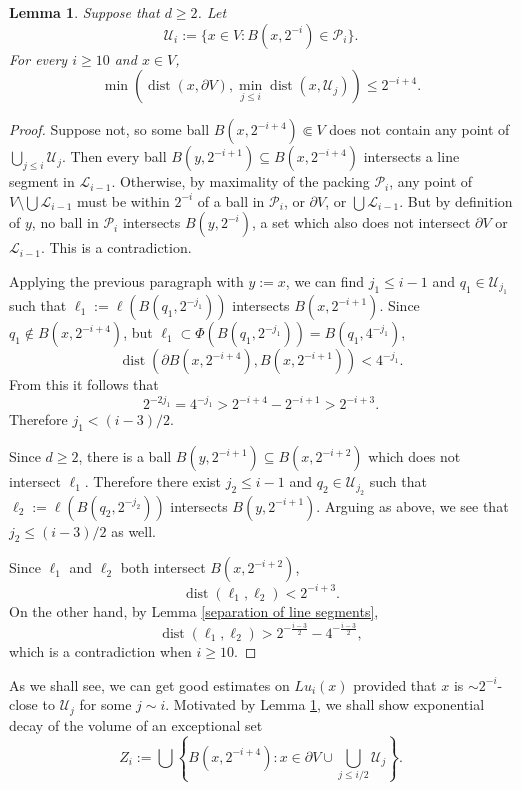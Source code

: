 \documentclass[reqno,11pt]{amsart}
\DeclareMathOperator{\dist}{dist}
\newtheorem{lemma}[theorem]{Lemma}
\theoremstyle{definition}
\numberwithin{equation}{section}
\begin{document}
\begin{lemma}\label{almost density of balls}
Suppose that $d \geq 2$. Let
$$\mathscr U_i := \{x \in V: B(x, 2^{-i}) \in \mathscr P_i\}.$$
For every $i \geq 10$ and $x \in V$,
$$\min\left(\dist(x, \partial V), \min_{j \leq i} \dist(x, \mathscr U_j)\right) \leq 2^{-i + 4}.$$
\end{lemma}
\begin{proof}
Suppose not, so some ball $B(x, 2^{-i + 4}) \Subset V$ does not contain any point of $\bigcup_{j \leq i} \mathscr U_j$.
Then every ball $B(y, 2^{-i + 1}) \subseteq B(x, 2^{-i + 4})$ intersects a line segment in $\mathscr L_{i - 1}$.
Otherwise, by maximality of the packing $\mathscr P_i$, any point of $V \setminus \bigcup \mathscr L_{i - 1}$ must be within $2^{-i}$ of a ball in $\mathscr P_i$, or $\partial V$, or $\bigcup \mathscr L_{i - 1}$.
But by definition of $y$, no ball in $\mathscr P_i$ intersects $B(y, 2^{-i})$, a set which also does not intersect $\partial V$ or $\mathscr L_{i - 1}$.
This is a contradiction.

Applying the previous paragraph with $y := x$, we can find $j_1 \leq i - 1$ and $q_1 \in \mathscr U_{j_1}$ such that $\ell_1 := \ell(B(q_1, 2^{-j_1}))$ intersects $B(x, 2^{-i + 1})$.
Since $q_1 \notin B(x, 2^{-i + 4})$, but $\ell_1 \subset \Phi(B(q_1, 2^{-j_1})) = B(q_1, 4^{-{j_1}})$,
$$\dist(\partial B(x, 2^{-i + 4}), B(x, 2^{-i + 1})) < 4^{-j_1}.$$
From this it follows that
$$2^{-2j_1} = 4^{-j_1} > 2^{-i + 4} - 2^{-i + 1} > 2^{-i + 3}.$$
Therefore $j_1 < (i - 3)/2$.

Since $d \geq 2$, there is a ball $B(y, 2^{-i + 1}) \subseteq B(x, 2^{-i + 2})$ which does not intersect $\ell_1$.
Therefore there exist $j_2 \leq i - 1$ and $q_2 \in \mathscr U_{j_2}$ such that $\ell_2 := \ell(B(q_2, 2^{-j_2}))$ intersects $B(y, 2^{-i + 1})$.
Arguing as above, we see that $j_2 \leq (i - 3)/2$ as well.

Since $\ell_1$ and $\ell_2$ both intersect $B(x, 2^{-i + 2})$,
$$\dist(\ell_1, \ell_2) < 2^{-i + 3}.$$
On the other hand, by Lemma \ref{separation of line segments},
$$\dist(\ell_1, \ell_2) > 2^{-\frac{i - 3}{2}} - 4^{-\frac{i - 3}{2}},$$
which is a contradiction when $i \geq 10$.
\end{proof}

As we shall see, we can get good estimates on $Lu_i(x)$ provided that $x$ is $\sim 2^{-i}$-close to $\mathscr U_j$ for some $j \sim i$.
Motivated by Lemma \ref{almost density of balls}, we shall show exponential decay of the volume of an exceptional set
\begin{equation}\label{exponential exceptional set}
Z_i := \bigcup \left\{B(x, 2^{-i+4}): x \in \partial V \cup \bigcup_{j \leq i/2} \mathscr U_j\right\}.
\end{equation}
\end{document}
